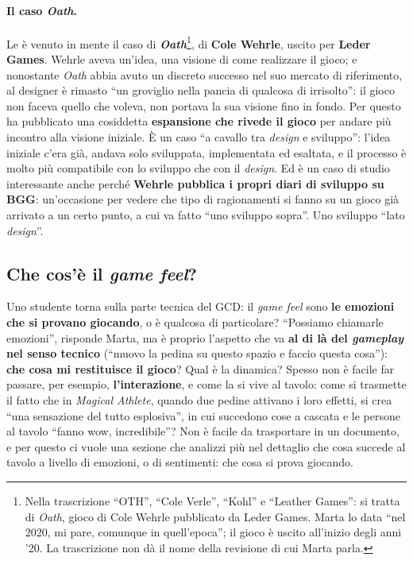 \paragraph{Il caso \emph{Oath}.} Le è venuto in mente il caso di
\textbf{\emph{Oath}}\footnote{Nella trascrizione ``OTH'', ``Cole Verle'', ``Kohl'' e
``Leather Games'': si tratta di \emph{Oath}, gioco di Cole Wehrle pubblicato da Leder
Games. Marta lo data ``nel 2020, mi pare, comunque in quell'epoca''; il gioco è uscito
all'inizio degli anni '20. La trascrizione non dà il nome della revisione di cui Marta
parla.}, di \textbf{Cole Wehrle}, uscito per \textbf{Leder Games}. Wehrle aveva un'idea, una
visione di come realizzare il gioco; e nonostante \emph{Oath} abbia avuto un discreto
successo nel suo mercato di riferimento, al designer è rimasto ``un groviglio nella pancia
di qualcosa di irrisolto'': il gioco non faceva quello che voleva, non portava la sua
visione fino in fondo. Per questo ha pubblicato una cosiddetta \textbf{espansione che rivede
il gioco} per andare più incontro alla visione iniziale. È un caso ``a cavallo tra
\emph{design} e sviluppo'': l'idea iniziale c'era già, andava solo sviluppata, implementata
ed esaltata, e il processo è molto più compatibile con lo sviluppo che con il
\emph{design}. Ed è un caso di studio interessante anche perché \textbf{Wehrle pubblica i
propri diari di sviluppo su BGG}: un'occasione per vedere che tipo di ragionamenti si fanno
su un gioco già arrivato a un certo punto, a cui va fatto ``uno sviluppo sopra''. Uno
sviluppo ``lato \emph{design}''.

\subsection{Che cos'è il \emph{game feel}?}
\label{a13:sec:gamefeel}

Uno studente torna sulla parte tecnica del GCD: il \emph{game feel} sono \textbf{le emozioni
che si provano giocando}, o è qualcosa di particolare? ``Possiamo chiamarle emozioni'',
risponde Marta, ma è proprio l'aspetto che va \textbf{al di là del \emph{gameplay} nel
senso tecnico} (``muovo la pedina su questo spazio e faccio questa cosa''): \textbf{che cosa
mi restituisce il gioco}? Qual è la dinamica? Spesso non è facile far passare, per esempio,
\textbf{l'interazione}, e come la si vive al tavolo: come si trasmette il fatto che in
\emph{Magical Athlete}, quando due pedine attivano i loro effetti, si crea ``una sensazione
del tutto esplosiva'', in cui succedono cose a cascata e le persone al tavolo ``fanno wow,
incredibile''? Non è facile da trasportare in un documento, e per questo ci vuole una
sezione che analizzi più nel dettaglio che cosa succede al tavolo a livello di emozioni, o
di sentimenti: che cosa si prova giocando.


